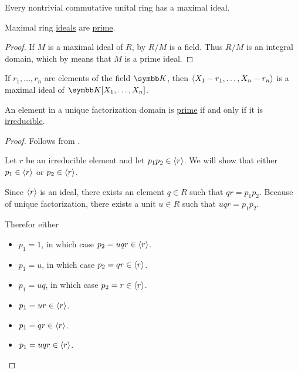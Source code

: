 \begin{theorem}\label{thm:krulls_theorem}
  Every nontrivial commutative unital ring has a maximal ideal.
\end{theorem}

\begin{proposition}\label{thm:maximal_ideals_are_prime}
  Maximal ring \hyperref[def:maximal_ring_ideal]{ideals} are \hyperref[def:prime_ring_ideal]{prime}.
\end{proposition}
\begin{proof}
  If \( M \) is a maximal ideal of \( R \), by  \( R / M \) is a field. Thus \( R / M \) is an integral domain, which by  means that \( M \) is a prime ideal.
\end{proof}

\begin{proposition}\label{thm:field_maximal_ideal_representation}
  If \( r_1, \ldots, r_n \) are elements of the field \( \BK \), then \( \left\langle X_1 - r_1, \ldots, X_n - r_n \right\rangle \) is a maximal ideal of \( \BK[X_1, \ldots, X_n] \).
\end{proposition}

\begin{proposition}\label{thm:ufd_prime_iff_irreducible}
  An element in a unique factorization domain is \hyperref[def:prime_ring_ideal]{prime} if and only if it is \hyperref[def:irreducible_ring_element]{irreducible}.
\end{proposition}
\begin{proof}
  \Sufficiency Follows from .

  \Necessity Let \( r \) be an irreducible element and let \( p_1 p_2 \in \left\langle r \right\rangle \). We will show that either  \( p_1 \in \left\langle r \right\rangle \) or \( p_2 \in \left\langle r \right\rangle \).

  Since \( \left\langle r \right\rangle \) is an ideal, there exists an element \( q \in R \) such that \( qr = p_1 p_2 \). Because of unique factorization, there exists a unit \( u \in R \) such that \( uqr = p_1 p_2  \).

  Therefor either
  \begin{itemize}
    \item \( p_1 = 1 \), in which case \( p_2 = uqr \in \left\langle r \right\rangle \).
    \item \( p_1 = u \), in which case \( p_2 = qr \in \left\langle r \right\rangle \).
    \item \( p_1 = uq \), in which case \( p_2 = r \in \left\langle r \right\rangle \).
    \item \( p_1 = ur \in \left\langle r \right\rangle \).
    \item \( p_1 = qr \in \left\langle r \right\rangle \).
    \item \( p_1 = uqr \in \left\langle r \right\rangle \).
  \end{itemize}
\end{proof}


